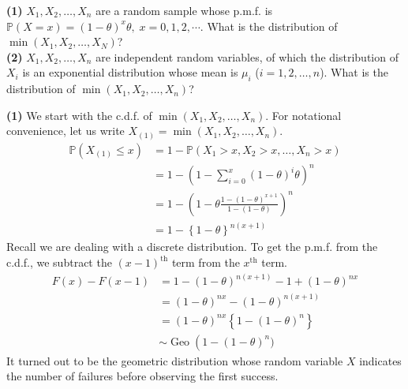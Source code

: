 \documentclass[answers]{exam}
\newcommand{\opn}{\operatorname}
\begin{document}
\newpage
{}
\begin{questions}
   \question
   \textbf{(1)} $X_{1}, X_{2}, \ldots , X_{n}$ are a random sample whose p.m.f. is $\mathbb{P}\left(X = x\right) = \left(1-\theta\right)^{x}\theta, \; x = 0, 1, 2, \cdots$. What is the distribution of $\min \left(X_{1}, X_{2}, \ldots , X_{N}\right)$?\\
   \textbf{(2)} $X_{1}, X_{2}, \ldots , X_{n}$ are independent random variables, of which the distribution of $X_{i}$ is an exponential distribution whose mean is $\mu_{i}$ ($i = 1, 2, \ldots , n$). What is the distribution of $\min \left(X_{1}, X_{2}, \ldots , X_{n}\right)$?
\begin{solution}
   \textbf{(1)} We start with the c.d.f. of $\min \left(X_{1}, X_{2}, \ldots , X_{n}\right)$. For notational convenience, let us write $X_{\left(1\right)} = \min \left(X_{1}, X_{2}, \ldots , X_{n}\right)$.
   \begin{align*}
      \mathbb{P}\left(X_{\left(1\right)} \leq x\right) &= 1 - \mathbb{P}\left(X_{1}>x, X_{2}>x, \ldots, X_{n}>x\right)\\
      &= 1-\left(1-\sum_{i=0}^{x}\left(1-\theta\right)^{i}\theta \right)^{n}\\
      &= 1 - \left(1-\theta \frac{1-\left(1-\theta\right)^{x+1}}{1-\left(1-\theta\right)}\right)^{n}\\
      &= 1- \left\{1-\theta \right\}^{n\left(x+1\right)}
   \end{align*}
   Recall we are dealing with a discrete distribution. To get the p.m.f. from the c.d.f., we subtract the $\left(x-1\right)^{\text{th}}$ term from the $x^{\text{th}}$ term.
   \begin{align*}
      F\left(x\right) - F\left(x-1\right) &= 1- \left(1-\theta\right)^{n\left(x+1\right)} - 1 + \left(1-\theta\right)^{nx}\\
      &= \left(1-\theta\right)^{nx} - \left(1-\theta\right)^{n\left(x+1\right)}\\
      &= \left(1-\theta\right)^{nx}\left\{1 - \left(1-\theta\right)^{n} \right\}\\
      &\sim \opn{Geo}\left(1-\left(1-\theta\right)^{n})
   \end{align*}
   It turned out to be the geometric distribution whose random variable $X$ indicates the number of failures before observing the first success.

\end{solution}
\end{questions}
\end{document}
